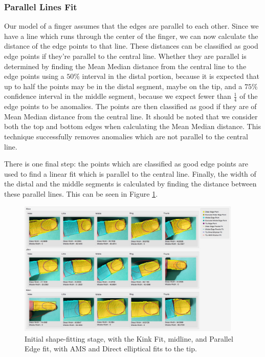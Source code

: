 \subsubsection{Parallel Lines Fit}\label{sec:ParallelLinesFit}
Our model of a finger assumes that the edges are parallel to each other. Since we have a line which runs through the center of the finger, we can now calculate the distance of the edge points to that line. These distances can be classified as good edge points if they're parallel to the central line. Whether they are parallel is determined by finding the Mean Median distance from the central line to the edge points using a $50\%$ interval in the distal portion, because it is expected that up to half the points may be in the distal segment, maybe on the tip, and a $75\%$ confidence interval in the middle segment, because we expect fewer than $\frac{1}{4}$ of the edge points to be anomalies. The points are then classified as good if they are of Mean Median distance from the central line. It should be noted that we consider both the top and bottom edges when calculating the Mean Median distance. This technique successfully removes anomalies which are not parallel to the central line.

There is one final step: the points which are classified as good edge points are used to find a linear fit which is parallel to the central line. Finally, the width of the distal and the middle segments is calculated by finding the distance between these parallel lines. This can be seen in Figure \ref{fig:ParallelFit}.

\begin{figure}[h!]
  \centering
    \includegraphics[width=0.95\textwidth]{Chapter4/Figs/ParallelFit.jpg}
    \caption{Initial shape-fitting stage, with the Kink Fit, midline, and Parallel Edge fit, with AMS and Direct elliptical fits to the tip.}\label{fig:ParallelFit}
\end{figure}

